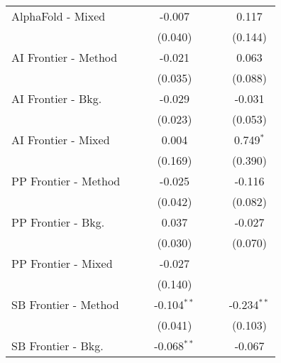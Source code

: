 \begin{tabular}{lcccccc}
   AlphaFold - Mixed    &               &               & -0.007         &               &               & 0.117\\   
                        &               &               & (0.040)        &               &               & (0.144)\\   
   AI Frontier - Method &               &               & -0.021         &               &               & 0.063\\   
                        &               &               & (0.035)        &               &               & (0.088)\\   
   AI Frontier - Bkg.   &               &               & -0.029         &               &               & -0.031\\   
                        &               &               & (0.023)        &               &               & (0.053)\\   
   AI Frontier - Mixed  &               &               & 0.004          &               &               & 0.749$^{*}$\\   
                        &               &               & (0.169)        &               &               & (0.390)\\   
   PP Frontier - Method &               &               & -0.025         &               &               & -0.116\\   
                        &               &               & (0.042)        &               &               & (0.082)\\   
   PP Frontier - Bkg.   &               &               & 0.037          &               &               & -0.027\\   
                        &               &               & (0.030)        &               &               & (0.070)\\   
   PP Frontier - Mixed  &               &               & -0.027         &               &               &   \\   
                        &               &               & (0.140)        &               &               &   \\   
   SB Frontier - Method &               &               & -0.104$^{**}$  &               &               & -0.234$^{**}$\\   
                        &               &               & (0.041)        &               &               & (0.103)\\   
   SB Frontier - Bkg.   &               &               & -0.068$^{**}$  &               &               & -0.067\\   

\end{tabular}
